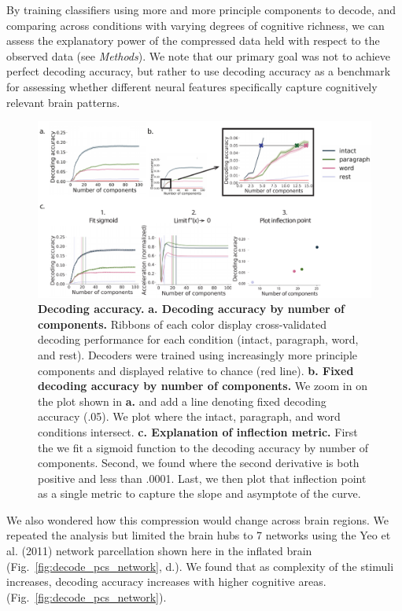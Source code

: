 By training classifiers using more and more principle components to decode, and
comparing across conditions with varying degrees of cognitive richness, we can
assess the explanatory power of the compressed data held with respect to the
observed data (see \textit{Methods}). We note that our primary goal was not to
achieve perfect decoding accuracy, but rather to use decoding accuracy as a
benchmark for assessing whether different neural features specifically capture
cognitively relevant brain patterns.

\begin{figure} \centering
\includegraphics[width=\textwidth]{figs/decode_interpret.pdf}
\caption{\textbf{Decoding accuracy.} \textbf{a. Decoding accuracy by number of
components.} Ribbons of each color display cross-validated decoding performance
for each condition (intact, paragraph, word, and rest). Decoders were trained
using increasingly more principle components and displayed relative to chance
(red line). \textbf{b. Fixed decoding accuracy by number of components.} We
zoom in on the plot shown in \textbf{a.} and add a line denoting fixed decoding
accuracy (.05). We plot where the intact, paragraph, and word conditions
intersect. \textbf{c. Explanation of inflection metric.} First the we fit a
sigmoid function to the decoding accuracy by number of components. Second, we
found where the second derivative is both positive and less than .0001. Last,
we then plot that inflection point as a single metric to capture the slope and
asymptote of the curve.} \label{fig:decode_interpret} \end{figure}




  We also wondered how this compression would change across brain regions. We
  repeated the analysis but limited the brain hubs to 7 networks using the Yeo
  et al. (2011) network parcellation shown here in the inflated brain
  (Fig.~\ref{fig:decode_pcs_network}, d.). We found that as complexity of the
  stimuli increases, decoding accuracy increases with higher cognitive areas.
  (Fig.~\ref{fig:decode_pcs_network}).





